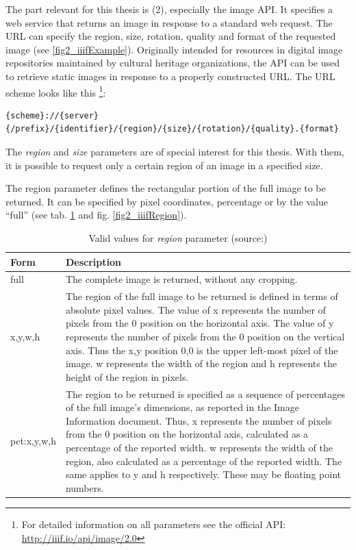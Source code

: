 The part relevant for this thesis is (2), especially the image API\cite{web:iiif}. It specifies a web service that returns an image in response to a standard web request. The URL can specify the region, size, rotation, quality and format of the requested image (see \ref{fig2_iiifExample}). Originally intended for resources in digital image repositories maintained by cultural heritage organizations, the API can be used to retrieve static images in response to a properly constructed URL\cite{web:openseadragon}. The URL scheme looks like this \footnote{For detailed information on all parameters see the official API: \url{http://iiif.io/api/image/2.0}}:
\begin{lstlisting}
{scheme}://{server}{/prefix}/{identifier}/{region}/{size}/{rotation}/{quality}.{format}
\end{lstlisting}

The \emph{region} and \emph{size} parameters are of special interest for this thesis. With them, it is possible to request only a certain region of an image in a specified size.

The region parameter defines the rectangular portion of the full image to be returned. It can be specified by pixel coordinates, percentage or by the value “full” (see tab. \ref{tab2_regionParams} and fig. \ref{fig2_iiifRegion}).

\begin{table}[H]
	\begin{center}
		\begin{tabular}{| p{2cm} | p{9cm} |}
			\hline
			\textbf{Form} & \textbf{Description}\\ \hline
			full & The complete image is returned, without any cropping.\\ \hline
			x,y,w,h & The region of the full image to be returned is defined in terms of absolute pixel values. The value of x represents the number of pixels from the 0 position on the horizontal axis. The value of y represents the number of pixels from the 0 position on the vertical axis. Thus the x,y position 0,0 is the upper left-most pixel of the image. w represents the width of the region and h represents the height of the region in pixels.\\ \hline
			pct:x,y,w,h & The region to be returned is specified as a sequence of percentages of the full image’s dimensions, as reported in the Image Information document. Thus, x represents the number of pixels from the 0 position on the horizontal axis, calculated as a percentage of the reported width. w represents the width of the region, also calculated as a percentage of the reported width. The same applies to y and h respectively. These may be floating point numbers.\\ \hline
		\end{tabular}
		\caption{Valid values for \emph{region} parameter (source:\cite{web:iiif})}
		\label{tab2_regionParams}
	\end{center}
\end{table}

